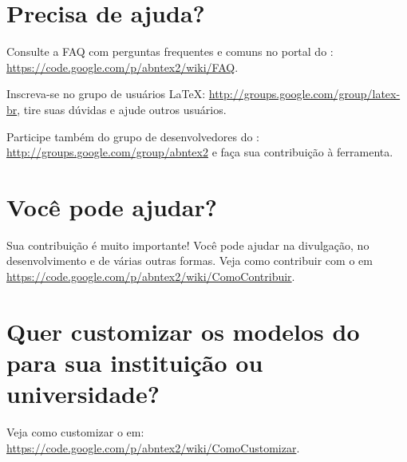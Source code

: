 \section{Precisa de ajuda?}

Consulte a FAQ com perguntas frequentes e comuns no portal do \abnTeX{}:
\url{https://code.google.com/p/abntex2/wiki/FAQ}.

Inscreva-se no grupo de usuários \LaTeX{}:
\url{http://groups.google.com/group/latex-br}, tire suas dúvidas e ajude
outros usuários.

Participe também do grupo de desenvolvedores do \abnTeX{}:
\url{http://groups.google.com/group/abntex2} e faça sua contribuição à
ferramenta.



\section{Você pode ajudar?}

Sua contribuição é muito importante! Você pode ajudar na divulgação, no
desenvolvimento e de várias outras formas. Veja como contribuir com o \abnTeX{}
em \url{https://code.google.com/p/abntex2/wiki/ComoContribuir}.



\section{Quer customizar os modelos do \texorpdfstring{\newline}{}\abnTeX{} para sua instituição ou
  universidade?}

Veja como customizar o \abnTeX{} em:
\url{https://code.google.com/p/abntex2/wiki/ComoCustomizar}.

